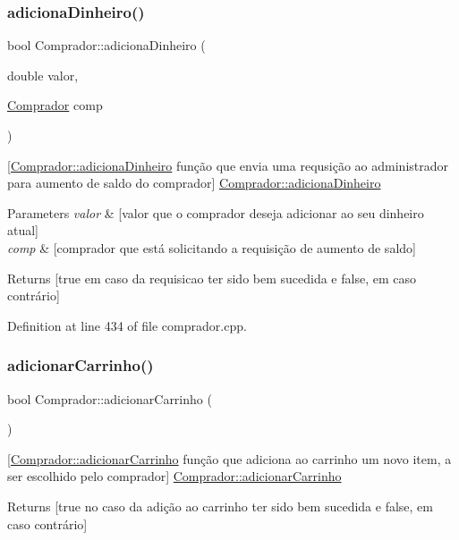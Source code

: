 \subsubsection{\texorpdfstring{adiciona\+Dinheiro()}{adicionaDinheiro()}}
{\footnotesize\ttfamily bool Comprador\+::adiciona\+Dinheiro (\begin{DoxyParamCaption}\item[{double}]{valor,  }\item[{\hyperlink{class_comprador}{Comprador}}]{comp }\end{DoxyParamCaption})}

\mbox{[}\hyperlink{class_comprador_ab996419e954d24ac9c97e646e81b0c9c}{Comprador\+::adiciona\+Dinheiro} função que envia uma requsição ao administrador para aumento de saldo do comprador\mbox{]}  \hyperlink{class_comprador_ab996419e954d24ac9c97e646e81b0c9c}{Comprador\+::adiciona\+Dinheiro} 
\begin{DoxyParams}{Parameters}
{\em valor} & \mbox{[}valor que o comprador deseja adicionar ao seu dinheiro atual\mbox{]} \\
\hline
{\em comp} & \mbox{[}comprador que está solicitando a requisição de aumento de saldo\mbox{]} \\
\hline
\end{DoxyParams}
\begin{DoxyReturn}{Returns}
\mbox{[}true em caso da requisicao ter sido bem sucedida e false, em caso contrário\mbox{]} 
\end{DoxyReturn}


Definition at line 434 of file comprador.\+cpp.

\mbox{\label{class_comprador_a321ef648a886ea8c567c5030e6ea1e65}} 
\subsubsection{\texorpdfstring{adicionar\+Carrinho()}{adicionarCarrinho()}}
{\footnotesize\ttfamily bool Comprador\+::adicionar\+Carrinho (\begin{DoxyParamCaption}{ }\end{DoxyParamCaption})}

\mbox{[}\hyperlink{class_comprador_a321ef648a886ea8c567c5030e6ea1e65}{Comprador\+::adicionar\+Carrinho} função que adiciona ao carrinho um novo item, a ser escolhido pelo comprador\mbox{]}  \hyperlink{class_comprador_a321ef648a886ea8c567c5030e6ea1e65}{Comprador\+::adicionar\+Carrinho} \begin{DoxyReturn}{Returns}
\mbox{[}true no caso da adição ao carrinho ter sido bem sucedida e false, em caso contrário\mbox{]} 
\end{DoxyReturn}


